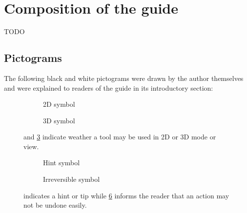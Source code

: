 \section{Composition of the guide}
\label{s:guide_comp}
TODO

\subsection{Pictograms}
\label{s:mm-pictograms}
The following black and white pictograms were drawn by the author themselves and were explained to readers of the guide in its introductory section:
\newline
\begin{figure}[h!]
	\begin{centering}
		\begin{subfigure}{0.5\textwidth}
			
			\caption{2D symbol}
			\label{fig:2d_icon}
		\end{subfigure}
		\begin{subfigure}{0.5\textwidth}
			
			\caption{3D symbol}
			\label{fig:3d_icon}
		\end{subfigure}
	\end{centering}
	\caption{ and \cref{fig:3d_icon} indicate weather a tool may be used in 2D or 3D mode or view.}
\end{figure}

\begin{figure}[h!]
	\begin{centering}
		\begin{subfigure}{0.5\textwidth}
			
			\caption{Hint symbol}
			\label{fig:hint_icon}
		\end{subfigure}
		\begin{subfigure}{0.5\textwidth}
			
			\caption{Irreversible symbol}
			\label{fig:noundo_icon}
		\end{subfigure}
	\end{centering}
	\caption{ indicates a hint or tip while \cref{fig:noundo_icon} informs the reader that an action may not be undone easily.}
\end{figure}

